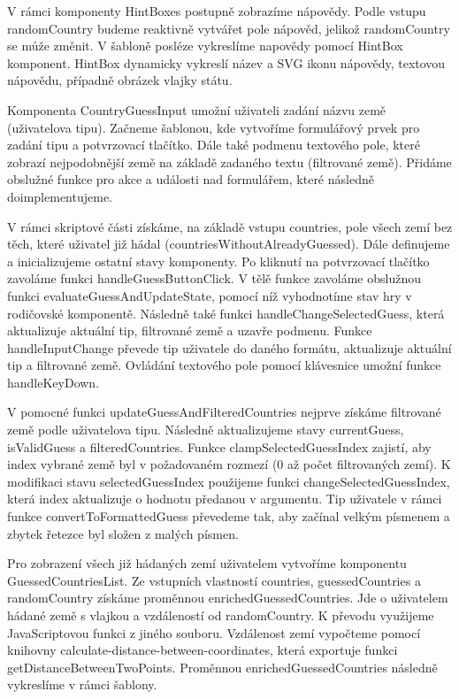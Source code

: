V rámci komponenty HintBoxes postupně zobrazíme nápovědy. Podle vstupu randomCountry budeme reaktivně vytvářet pole nápověd, jelikož randomCountry se může změnit. 
V šabloně posléze vykreslíme napovědy pomocí HintBox komponent. HintBox dynamicky vykreslí název a SVG ikonu nápovědy, textovou nápovědu, případně obrázek vlajky státu.

Komponenta CountryGuessInput umožní uživateli zadání názvu země (uživatelova tipu). Začneme šablonou, kde vytvoříme formulářový prvek pro zadání tipu a potvrzovací tlačítko. 
Dále také podmenu textového pole, které zobrazí nejpodobnější země na základě zadaného textu (filtrované země). Přidáme obslužné funkce pro akce a události nad formulářem, které následně doimplementujeme.

V rámci skriptové části získáme, na základě vstupu countries, pole všech zemí bez těch, které uživatel již hádal (countriesWithoutAlreadyGuessed). Dále definujeme a inicializujeme ostatní stavy komponenty. 
Po kliknutí na potvrzovací tlačítko zavoláme funkci handleGuessButtonClick. V tělě funkce zavoláme obslužnou funkci evaluateGuessAndUpdateState, pomocí níž vyhodnotíme stav hry v rodičovské komponentě. 
Následně také funkci handleChangeSelectedGuess, která aktualizuje aktuální tip, filtrované země a uzavře podmenu. Funkce handleInputChange převede tip uživatele do daného formátu, aktualizuje aktuální tip a filtrované země. 
Ovládání textového pole pomocí klávesnice umožní funkce handleKeyDown.

V pomocné funkci updateGuessAndFilteredCountries nejprve získáme filtrované země podle uživatelova tipu. Následně aktualizujeme stavy currentGuess, isValidGuess a filteredCountries. 
Funkce clampSelectedGuessIndex zajistí, aby index vybrané země byl v požadovaném rozmezí (0 až počet filtrovaných zemí). 
K modifikaci stavu selectedGuessIndex použijeme funkci changeSelectedGuessIndex, která index aktualizuje o hodnotu předanou v argumentu. 
Tip uživatele v rámci funkce convertToFormattedGuess převedeme tak, aby začínal velkým písmenem a zbytek řetezce byl složen z malých písmen.

Pro zobrazení všech již hádaných zemí uživatelem vytvoříme komponentu GuessedCountriesList. Ze vstupních vlastností countries, guessedCountries a randomCountry získáme proměnnou enrichedGuessedCountries. 
Jde o uživatelem hádané země s vlajkou a vzdáleností od randomCountry. K převodu využijeme JavaScriptovou funkci z jiného souboru. 
Vzdálenost zemí vypočteme pomocí knihovny calculate-distance-between-coordinates, která exportuje funkci getDistanceBetweenTwoPoints. Proměnnou enrichedGuessedCountries následně vykreslíme v rámci šablony.

